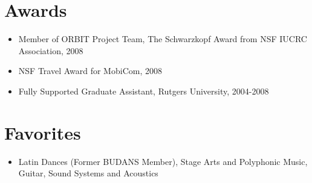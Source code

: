 \documentclass[10pt]{article}
\begin{document}
\section{Awards}
\begin{itemize}
\item Member of ORBIT Project Team, The Schwarzkopf Award from NSF IUCRC
Association, 2008
\item NSF Travel Award for MobiCom, 2008
\item Fully Supported Graduate Assistant, Rutgers University, 2004-2008
\end{itemize}

\section{Favorites}
\begin{itemize}
\item Latin Dances (Former BUDANS Member), Stage Arts and Polyphonic
Music, Guitar, Sound Systems and Acoustics
\end{itemize}
\end{document}

